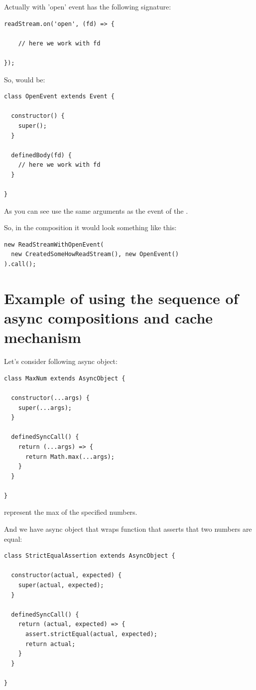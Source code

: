 \documentclass{article}
\newcommand{\cit}[1]{{\fontfamily{qcr}\selectfont{\textcolor{superdarkgray}{#1}}}}
\begin{document}
Actually \cit{readStream} with 'open' event has the following signature:

\begin{lstlisting}
readStream.on('open', (fd) => {
    
    // here we work with fd
    
});
\end{lstlisting}

So, \cit{OpenEvent} would be:

\begin{lstlisting}
class OpenEvent extends Event {

  constructor() {
    super();
  }

  definedBody(fd) {
    // here we work with fd
  }

}
\end{lstlisting}

As you can see \cit{definedBody} use the same arguments as the event of the \cit{readStream}. 

So, in the composition it would look something like this:

\begin{lstlisting}
new ReadStreamWithOpenEvent(
  new CreatedSomeHowReadStream(), new OpenEvent()
).call();
\end{lstlisting}

\section{Example of using the sequence of async compositions and cache mechanism}

Let's consider following async object:

\begin{lstlisting}
class MaxNum extends AsyncObject {

  constructor(...args) {
    super(...args);
  }

  definedSyncCall() {
    return (...args) => {
      return Math.max(...args);
    }
  }

}
\end{lstlisting}

\cit{MaxNum} represent the max of the specified numbers.

And we have async object that wraps \cit{assert.strictEqual} function that asserts that two numbers are equal:

\begin{lstlisting}
class StrictEqualAssertion extends AsyncObject {

  constructor(actual, expected) {
    super(actual, expected);
  }

  definedSyncCall() {
    return (actual, expected) => {
      assert.strictEqual(actual, expected);
      return actual;
    }
  }

}
\end{lstlisting}
\end{document}
